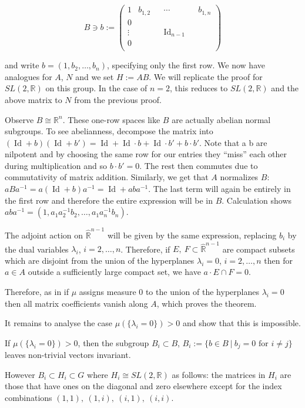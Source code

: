 \documentclass[
  12pt
]{article}
\theoremstyle{plain}
\newcommand{\bbr}{\ensuremath{\mathbb{R}}\xspace}
\newcommand{\sltr}{\ensuremath{SL(2, \mathbb{R})}\xspace}
\DeclareMathOperator{\Id}{Id}
\begin{document}
  $$
    B \ni b := \begin{pmatrix}
      1 & b_{1,2} & & \cdots & & b_{1,n} \\
      0 & & &  & \\
      \vdots & & & \Id_{n-1} & \\
      0 & & & & \\
    \end{pmatrix}
  $$

  and write $b = (1, b_2, \dots, b_n)$, specifying only the first row.
  We now have analogues for $A$, $N$ and we set $H:=AB$. We will replicate the proof for \sltr on this group.
  In the case of $n = 2$, this reduces to \sltr and the above matrix to $N$ from the previous proof.

  Observe $B \cong \bbr^n$.
  These one-row spaces like $B$ are actually abelian normal subgroups.
  To see abelianness, decompose the matrix into $(\Id + b)(\Id +b') = \Id + \Id\cdot b + \Id\cdot b' + b\cdot b'$.
  Note that a b are nilpotent and by choosing the same row for our entries they
  ``miss'' each other during multiplication and so $b\cdot b' =0$. The rest then commutes
  due to commutativity of matrix addition.
  Similarly, we get that $A$ normalizes $B$: $aBa^{-1} = a(\Id + b)a^{-1} = \Id + aba^{-1}$.
  The last term will again be entirely in the first row and therefore the entire expression will be in $B$.
  Calculation shows $aba^{-1} = (1, a_1a_2^{-1}b_2, \dots, a_1a_n^{-1}b_n)$.

  The adjoint action on $\hat{\bbr}^{n-1}$ will be given by the same expression,
  replacing $b_i$ by the dual variables $\lambda_i$, $i = 2, \dots , n$.
  Therefore, if $E,\ F \subset \hat{\bbr}^{n-1}$ are
  compact subsets which are disjoint from the union of the hyperplanes $\lambda_i = 0$,
  $i = 2, \dots , n$ then for $a\in A$ outside a sufficiently large compact set, we have
  $a\cdot E \cap F = 0$.

  Therefore, as in  if $\mu$ assigns measure $0$ to the union of the hyperplanes $\lambda_i =0$ then all matrix coefficients vanish along $A$, which proves the theorem.

  It remains to analyse the case $\mu(\{\lambda_i=0\}) > 0$ and show that this is impossible.

  If $\mu(\{\lambda_i=0\}) > 0$, then the subgroup $B_i \subset B$, $B_i := \{b \in B\ |\ b_j=0 \text{ for } i\neq j\}$ leaves non-trivial vectors invariant.

  However $B_i \subset H_i \subset G$ where $H_i \cong \sltr$ as follows: the matrices in $H_i$ are those that have ones on the diagonal and zero elsewhere except for the index combinations $(1,1),\ (1,i),\ (i,1),\ (i,i)$.
\end{document}
